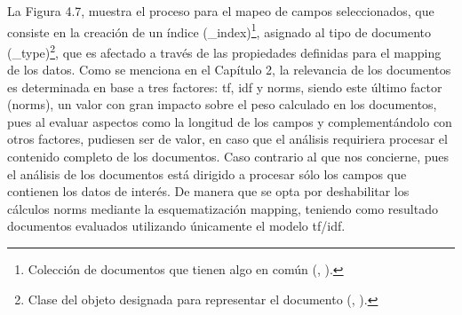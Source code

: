 La Figura 4.7, muestra el proceso para el mapeo de campos seleccionados, que consiste en la creación de un índice (\_index)\footnote{Colección de documentos que tienen algo en común (\citeauthor{elastic_meta}, \citeyear{elastic_meta}).}, asignado al tipo de documento (\_type)\footnote{Clase del objeto designada para representar el documento (\citeauthor{elastic_meta}, \citeyear{elastic_meta}).}, que es afectado a través de las propiedades definidas para el mapping de los datos. Como se menciona en el Capítulo 2, la relevancia de los documentos es determinada en base a tres factores: tf, idf y norms, siendo este último factor (norms), un valor con gran impacto sobre el peso calculado en los documentos, pues al evaluar aspectos como la longitud de los campos y complementándolo con otros factores, pudiesen ser de valor, en caso que el análisis  requiriera procesar el contenido completo de los documentos. Caso contrario al que nos concierne, pues el análisis de los documentos está dirigido a procesar sólo los campos que contienen los datos de interés. De manera que se opta por deshabilitar los cálculos norms mediante la esquematización mapping, teniendo como resultado documentos evaluados utilizando únicamente el modelo tf/idf.

